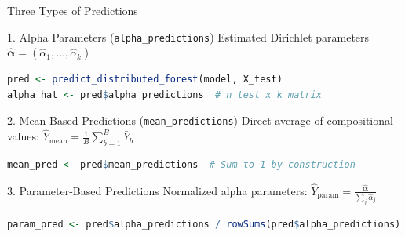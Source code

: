 \documentclass[aspectratio=169]{beamer}
\begin{document}
\begin{frame}[fragile]{Three Types of Predictions}

\begin{block}{1. Alpha Parameters (\texttt{alpha\_predictions})}
Estimated Dirichlet parameters $\hat{\boldsymbol{\alpha}} = (\hat{\alpha}_1, \ldots, \hat{\alpha}_k)$
\end{block}

\begin{lstlisting}[language=R, basicstyle=\tiny\ttfamily]
pred <- predict_distributed_forest(model, X_test)
alpha_hat <- pred$alpha_predictions  # n_test x k matrix
\end{lstlisting}

\vspace{0.2cm}

\begin{block}{2. Mean-Based Predictions (\texttt{mean\_predictions})}
Direct average of compositional values: $\hat{Y}_{\text{mean}} = \frac{1}{B}\sum_{b=1}^{B} \bar{Y}_b$
\end{block}

\begin{lstlisting}[language=R, basicstyle=\tiny\ttfamily]
mean_pred <- pred$mean_predictions  # Sum to 1 by construction
\end{lstlisting}

\vspace{0.2cm}

\begin{block}{3. Parameter-Based Predictions}
Normalized alpha parameters: $\hat{Y}_{\text{param}} = \frac{\hat{\boldsymbol{\alpha}}}{\sum_j \hat{\alpha}_j}$
\end{block}

\begin{lstlisting}[language=R, basicstyle=\tiny\ttfamily]
param_pred <- pred$alpha_predictions / rowSums(pred$alpha_predictions)
\end{lstlisting}

\end{frame}
\end{document}
